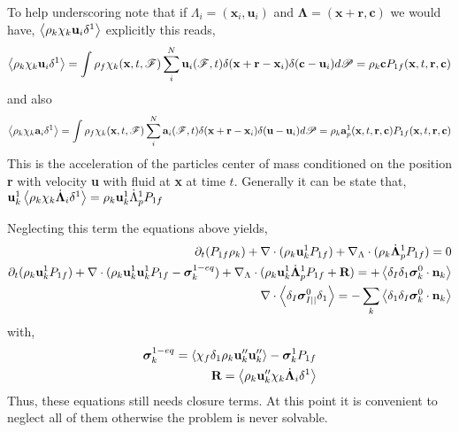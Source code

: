 To help underscoring note that if $\Lambda_i = (\textbf{x}_i,\textbf{u}_i)$ and $\bm\Lambda = (\textbf{x}+\textbf{r},\textbf{c})$ we would have, $\left<\rho_k  \chi_k \textbf{u}_i \delta^1\right>$ explicitly this reads, 
\begin{equation}
    \left<\rho_k  \chi_k \textbf{u}_i \delta^1\right>
    = \int 
    \rho_f \chi_k(\textbf{x},t,\mathscr{F})
    \sum_i^N \textbf{u}_i(\mathscr{F},t) 
    \delta(\textbf{x}+\textbf{r}-\textbf{x}_i)
    \delta(\textbf{c}-\textbf{u}_i)
    d\mathscr{P}
    = 
    \rho_k \textbf{c}
    P_{1f}(\textbf{x},t,\textbf{r},\textbf{c})
\end{equation}
and also 
\begin{equation}
    \left<\rho_k  \chi_k \textbf{a}_i \delta^1\right>
    = \int 
    \rho_f \chi_k(\textbf{x},t,\mathscr{F})
    \sum_i^N \textbf{a}_i(\mathscr{F},t) 
    \delta(\textbf{x}+\textbf{r}-\textbf{x}_i)
    \delta(\textbf{u}-\textbf{u}_i)
    d\mathscr{P}
    = 
    \rho_k \textbf{a}_p^1(\textbf{x},t,\textbf{r},\textbf{c})
    P_{1f}(\textbf{x},t,\textbf{r},\textbf{c})
\end{equation}
This is the acceleration of the particles center of mass conditioned on the position \textbf{r} with velocity \textbf{u} with fluid at \textbf{x} at time $t$. 
Generally it can be state that, $\textbf{u}_k^1 \left<\rho_k  \chi_k \dot{\bm\Lambda}_i \delta^1\right> = \rho_k \textbf{u}_k^1 \dot{\Lambda}_p^1 P_{1f}$

Neglecting this term the equations above yields, 
\begin{align}
    \partial_t ( P_{1f} \rho_k )
    + \mathbf{\nabla}\cdot (
        \rho_k  \textbf{u}_k^1 P_{1f}
        )
    +  \mathbf{\nabla}_\Lambda \cdot ( \rho_k \dot{\bm\Lambda}_p^1 P_{1f})
    = 
    0 \\
    \partial_t (\rho_k \textbf{u}_k^1 P_{1f})
    + \mathbf{\nabla}\cdot (
         \rho_k \textbf{u}_k^1 \textbf{u}_k^1 P_{1f}
        - \bm\sigma_k^{1-eq}
        )
    +  \mathbf{\nabla}_\Lambda \cdot ( \rho_k \textbf{u}_k^1 \dot{\bm\Lambda}_p^1 P_{1f} + \textbf{R})
    = 
    + \left<\delta_I\delta_1
         \bm\sigma_k^0
    \cdot \textbf{n}_k\right>\\
        \mathbf{\nabla}\cdot \left<\delta_I \bm\sigma_{I||}^0 \delta_1 \right>
        = 
        - \sum_k\left<\delta_1
        \delta_I
        \bm\sigma_k^0
   \cdot \textbf{n}_k\right>
\end{align}
with, 
\begin{align}
    \bm\sigma_k^{1-eq}
    =
    \left<\chi_f \delta_1 \rho_k \textbf{u}''_k\textbf{u}''_k\right>
    - \bm\sigma_k^1 P_{1f}\\
    \textbf{R}
    = 
    \left<\rho_k \textbf{u}_k'' \chi_k \dot{\bm\Lambda}_i \delta^1\right>
\end{align}
Thus, these equations still needs closure terms. 
At this point it is convenient to neglect all of them otherwise the problem is never solvable. 

